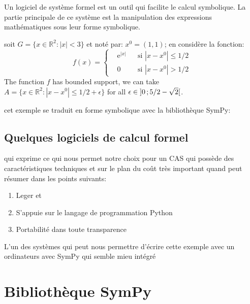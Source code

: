 \documentclass[11pt,fleqn]{book} %
\begin{document}
\begin{definition}
Un logiciel de système formel est un outil qui facilite le calcul symbolique. La partie principale de ce système est la manipulation des expressions mathématiques sous leur forme symbolique.
\end{definition}

\begin{example}
soit $G=\{x\in\mathbb{R}^2:|x|<3\}$ et noté par: $x^0=(1,1)$; en considère la fonction:
\begin{equation}
f(x)=\left\{\begin{aligned} & \mathrm{e}^{|x|} & & \text{si $|x-x^0|\leq 1/2$}\\
& 0 & & \text{si $|x-x^0|> 1/2$}\end{aligned}\right.
\end{equation}
The function $f$ has bounded support, we can take $A=\{x\in\mathbb{R}^2:|x-x^0|\leq 1/2+\epsilon\}$ for all $\epsilon\in\mathopen{]}0\,;5/2-\sqrt{2}\mathclose{[}$.
\end{example}

cet exemple se traduit en forme symbolique avec la bibliothèque SymPy:

\subsection{Quelques logiciels de calcul formel}

qui exprime ce qui nous permet notre choix pour un CAS qui possède des caractéristiques techniques et sur le plan du coût très important quand peut résumer dans les points suivants:
\begin{enumerate}
	\item Leger et 
	\item S’appuie sur le langage de programmation Python
	\item Portabilité dans toute transparence
\end{enumerate}

L'un des systèmes qui peut nous permettre d'écrire cette exemple avec un ordinateurs avec SymPy qui semble mieu intégré

\section{Bibliothèque SymPy}
\end{document}
